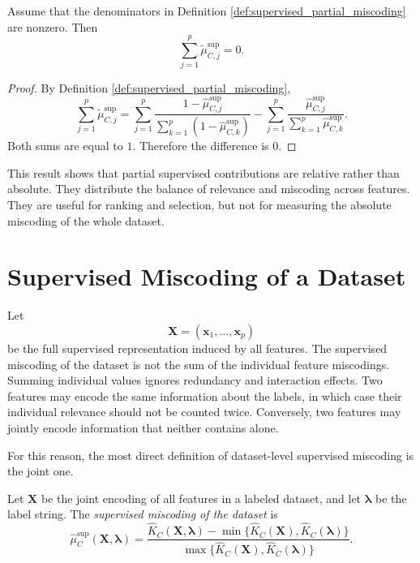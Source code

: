 \begin{proposition}
\label{prop:partial_supervised_sum_zero}
Assume that the denominators in Definition \ref{def:supervised_partial_miscoding} are nonzero. Then
\[
    \sum_{j=1}^p \tilde\mu_{C,j}^{\mathrm{sup}}=0.
\]
\end{proposition}

\begin{proof}
By Definition \ref{def:supervised_partial_miscoding},
\[
    \sum_{j=1}^p \tilde\mu_{C,j}^{\mathrm{sup}}
    =
    \sum_{j=1}^p
    \frac{
        1-\hat\mu_{C,j}^{\mathrm{sup}}
    }
    {
        \sum_{k=1}^p \left(1-\hat\mu_{C,k}^{\mathrm{sup}}\right)
    }
    -
    \sum_{j=1}^p
    \frac{
        \hat\mu_{C,j}^{\mathrm{sup}}
    }
    {
        \sum_{k=1}^p \hat\mu_{C,k}^{\mathrm{sup}}
    }.
\]
Both sums are equal to \(1\). Therefore the difference is \(0\).
\end{proof}

This result shows that partial supervised contributions are relative rather than absolute. They distribute the balance of relevance and miscoding across features. They are useful for ranking and selection, but not for measuring the absolute miscoding of the whole dataset.

\section{Supervised Miscoding of a Dataset}
\label{sec:supervised_miscoding_dataset}

Let
\[
    \mathbf X = (\mathbf{x}_1,\ldots,\mathbf{x}_p)
\]
be the full supervised representation induced by all features. The supervised miscoding of the dataset is not the sum of the individual feature miscodings. Summing individual values ignores redundancy and interaction effects. Two features may encode the same information about the labels, in which case their individual relevance should not be counted twice. Conversely, two features may jointly encode information that neither contains alone.

For this reason, the most direct definition of dataset-level supervised miscoding is the joint one.

\begin{definition}
\label{def:dataset_supervised_miscoding}
Let \(\mathbf X\) be the joint encoding of all features in a labeled dataset, and let \(\boldsymbol{\lambda}\) be the label string. The \emph{supervised miscoding of the dataset} is
\[
    \hat\mu_C^{\mathrm{sup}}(\mathbf X,\boldsymbol{\lambda})
    =
    \frac{
        \hat K_C(\mathbf X,\boldsymbol{\lambda})
        -
        \min\{\hat K_C(\mathbf X),\hat K_C(\boldsymbol{\lambda})\}
    }
    {
        \max\{\hat K_C(\mathbf X),\hat K_C(\boldsymbol{\lambda})\}
    }.
\]
\end{definition}

